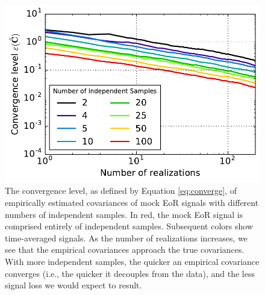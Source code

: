 \documentclass[preprint2,numberedappendix,tighten]{aastex6}  %
\begin{document}
\begin{figure}
	\centering
	\includegraphics[width=\columnwidth]{plots/toy_sigloss16.pdf}
	\caption{The convergence level, as defined by Equation \eqref{eq:converge}, of empirically estimated covariances of mock EoR signals with different numbers of independent samples. In red, the mock EoR signal is comprised entirely of independent samples. Subsequent colors show time-averaged signals. As the number of realizations increases, we see that the empirical covariances approach the true covariances. With more independent samples, the quicker an empirical covariance converges (i.e., the quicker it decouples from the data), and the less signal loss we would expect to result.}
	\label{fig:toy_sigloss16}
\end{figure}
\end{document}
